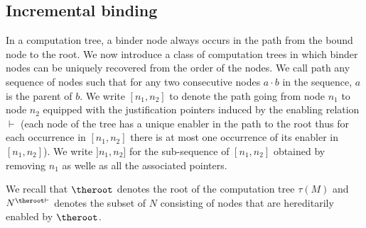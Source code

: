 

\subsection{Incremental binding}

In a computation tree, a binder node always occurs in the path from
the bound node to the root. We now introduce a class of computation
trees in which binder nodes can be uniquely recovered from the order
of the nodes. We call path any sequence of nodes such that for any
two consecutive nodes $a \cdot b$ in the sequence, $a$ is the parent
of $b$. We write $[n_1,n_2]$ to denote the path going from node
$n_1$ to node $n_2$ equipped with the justification pointers induced
by the enabling relation $\vdash$ (each node of the tree has a
unique enabler in the path to the root thus for each occurrence in
$[n_1,n_2]$ there is at most one occurrence of its enabler in
$[n_1,n_2]$). We write $]n_1,n_2]$ for the sub-sequence of
$[n_1,n_2]$ obtained by removing $n_1$ as welle as all the
associated pointers.

We recall that $\theroot$ denotes the root of the computation tree
$\tau(M)$ and $N^{\theroot\vdash}$ denotes the subset of $N$
consisting of nodes that are hereditarily enabled by $\theroot$.



